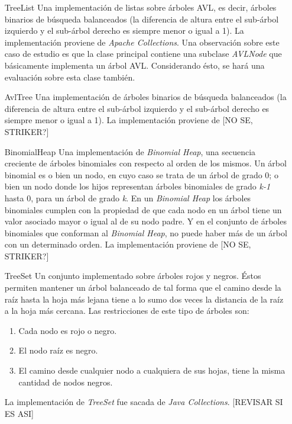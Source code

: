 \begin{enumerate}[leftmargin=.75cm,align=left,style=nextline]
	\item[TreeList] Una implementaci\'on de listas sobre \'arboles AVL, es decir, \'arboles binarios de b\'usqueda balanceados (la diferencia de altura entre el sub-\'arbol izquierdo y el sub-\'arbol derecho es siempre menor o igual a 1). La implementaci\'on proviene de \emph{Apache Collections}. Una observaci\'on sobre este caso de estudio es que la clase principal contiene una subclase \emph{AVLNode} que b\'asicamente implementa un \'arbol AVL. Considerando \'esto, se har\'a una evaluaci\'on sobre esta clase tambi\'en.
	
	\item[AvlTree] Una implementaci\'on de \'arboles binarios de b\'usqueda balanceados (la diferencia de altura entre el sub-\'arbol izquierdo y el sub-\'arbol derecho es siempre menor o igual a 1). La implementaci\'on proviene de [NO SE, STRIKER?]
	
	\item[BinomialHeap] Una implementaci\'on de \emph{Binomial Heap}, una secuencia creciente de \'arboles binomiales con respecto al orden de los mismos. Un \'arbol binomial es o bien un nodo, en cuyo caso se trata de un \'arbol de grado 0; o bien un nodo donde los hijos representan \'arboles binomiales de grado \emph{k-1} hasta 0, para un \'arbol de grado \emph{k}. En un \emph{Binomial Heap} los \'arboles binomiales cumplen con la propiedad de que cada nodo en un \'arbol tiene un valor asociado mayor o igual al de su nodo padre. Y en el conjunto de \'arboles binomiales que conforman al \emph{Binomial Heap}, no puede haber m\'as de un \'arbol con un determinado orden. La implementaci\'on proviene de [NO SE, STRIKER?]
	
	\item[TreeSet] Un conjunto implementado sobre \'arboles rojos y negros. \'Estos permiten mantener un \'arbol balanceado de tal forma que el camino desde la ra\'iz hasta la hoja m\'as lejana tiene a lo sumo dos veces la distancia de la ra\'iz a la hoja m\'as cercana. Las restricciones de este tipo de \'arboles son:
	\begin{enumerate}
		\item Cada nodo es rojo o negro.
		\item El nodo ra\'iz es negro.
		\item El camino desde cualquier nodo a cualquiera de sus hojas, tiene la misma cantidad de nodos negros.
	\end{enumerate}
	La implementaci\'on de \emph{TreeSet} fue sacada de \emph{Java Collections}. [REVISAR SI ES ASI]
	

\end{enumerate}
